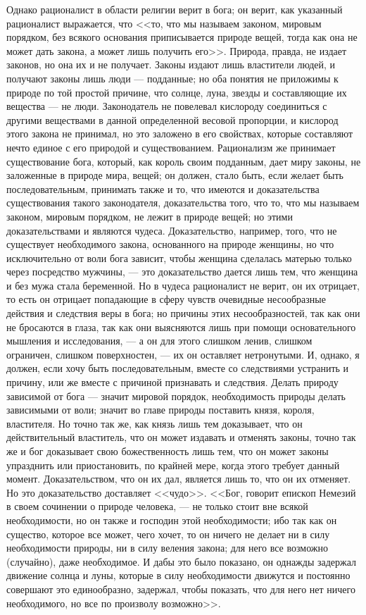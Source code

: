 \documentclass[12pt]{article}
\begin{document}
Однако рационалист в области религии верит в бога; он верит, как указанный рационалист выражается, что <<то, что мы называем законом, мировым порядком, без всякого основания приписывается природе вещей, тогда как она не может дать закона, а может лишь получить его>>. Природа, правда, не издает законов, но она их и не получает. Законы издают лишь властители людей, и получают законы лишь люди --- подданные; но оба понятия не приложимы к природе по той простой причине, что солнце, луна, звезды и составляющие их вещества --- не люди. Законодатель не повелевал кислороду соединиться с другими веществами в данной определенной весовой пропорции, и кислород этого закона не принимал, но это заложено в его свойствах, которые составляют нечто единое с его природой и существованием. Рационализм же принимает существование бога, который, как король своим подданным, дает миру законы, не заложенные в природе мира, вещей; он должен, стало быть, если желает быть последовательным, принимать также и то, что имеются и доказательства существования такого законодателя, доказательства того, что то, что мы называем законом, мировым порядком, не лежит в природе вещей; но этими доказательствами и являются чудеса. Доказательство, например, того, что не существует необходимого закона, основанного на природе женщины, но что исключительно от воли бога зависит, чтобы женщина сделалась матерью только через посредство мужчины, --- это доказательство дается лишь тем, что женщина и без мужа стала беременной. Но в чудеса рационалист не верит, он их отрицает, то есть он отрицает попадающие в сферу чувств очевидные несообразные действия и следствия веры в бога; но причины этих несообразностей, так как они не бросаются в глаза, так как они выясняются лишь при помощи основательного мышления и исследования, --- а он для этого слишком ленив, слишком ограничен, слишком поверхностен, --- их он оставляет нетронутыми. И, однако, я должен, если хочу быть последовательным, вместе со следствиями устранить и причину, или же вместе с причиной признавать и следствия. Делать природу зависимой от бога --- значит мировой порядок, необходимость природы делать зависимыми от воли; значит во главе природы поставить князя, короля, властителя. Но точно так же, как князь лишь тем доказывает, что он действительный властитель, что он может издавать и отменять законы, точно так же и бог доказывает свою божественность лишь тем, что он может законы упразднить или приостановить, по крайней мере, когда этого требует данный момент. Доказательством, что он их дал, является лишь то, что он их отменяет. Но это доказательство доставляет <<чудо>>. <<Бог, говорит епископ Немезий в своем сочинении о природе человека, --- не только стоит вне всякой необходимости, но он также и господин этой необходимости; ибо так как он существо, которое все может, чего хочет, то он ничего не делает ни в силу необходимости природы, ни в силу веления закона; для него все возможно (случайно), даже необходимое. И дабы это было показано, он однажды задержал движение солнца и луны, которые в силу необходимости движутся и постоянно совершают это единообразно, задержал, чтобы показать, что для него нет ничего необходимого, но все по произволу возможно>>. 
\end{document}
